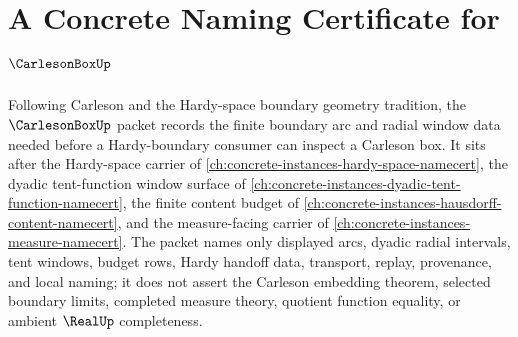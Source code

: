 \chapter{A Concrete Naming Certificate for $\CarlesonBoxUp$}
\label{ch:concrete-instances-carleson-box-namecert}

Following Carleson and the Hardy-space boundary geometry tradition, the $\CarlesonBoxUp$ packet records the finite boundary arc and radial window data needed before a Hardy-boundary consumer can inspect a Carleson box. It sits after the Hardy-space carrier of \autoref{ch:concrete-instances-hardy-space-namecert}, the dyadic tent-function window surface of \autoref{ch:concrete-instances-dyadic-tent-function-namecert}, the finite content budget of \autoref{ch:concrete-instances-hausdorff-content-namecert}, and the measure-facing carrier of \autoref{ch:concrete-instances-measure-namecert}. The packet names only displayed arcs, dyadic radial intervals, tent windows, budget rows, Hardy handoff data, transport, replay, provenance, and local naming; it does not assert the Carleson embedding theorem, selected boundary limits, completed measure theory, quotient function equality, or ambient $\RealUp$ completeness.


